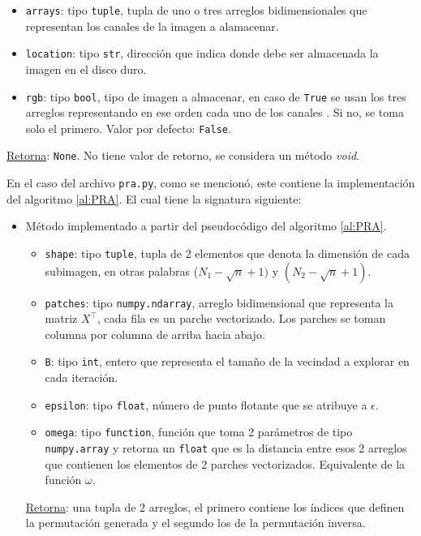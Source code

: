 \begin{itemize}
	\begin{itemize}
		\item \texttt{arrays}: tipo \texttt{tuple}, tupla de uno o tres arreglos bidimensionales que representan los canales de la imagen a alamacenar.
		\item \texttt{location}: tipo \texttt{str}, direcci\'on que indica donde debe ser almacenada la imagen en el disco duro.
		\item \texttt{rgb}: tipo \texttt{bool}, tipo de imagen a almacenar, en caso de \texttt{True} se usan los tres arreglos representando en ese orden cada uno de los canales \RGB. Si no, se toma solo el primero. Valor por defecto: \texttt{False}. 
	\end{itemize}
	\underline{Retorna}: \texttt{None}. No tiene valor de retorno, se considera un m\'etodo \textit{void}.
\end{itemize}

En el caso del archivo \texttt{pra.py}, como se mencion\'o, este contiene la implementaci\'on del algoritmo \ref{al:PRA}. El cual tiene la signatura siguiente:
\begin{itemize}
	\item M\'etodo implementado a partir del pseudoc\'odigo del algoritmo \ref{al:PRA}.
	
	\begin{itemize}
		\item \texttt{shape}: tipo \texttt{tuple}, tupla de 2 elementos que denota la dimensi\'on de cada subimagen, en otras palabras ($N_1 - \sqrt{n} + 1)$ y $(N_2 - \sqrt{n} + 1)$.
		\item \texttt{patches}: tipo \texttt{numpy.ndarray}, arreglo bidimensional que representa la matriz $X^\intercal$, cada fila es un parche vectorizado. Los parches se toman columna por columna de arriba hacia abajo.
		\item \texttt{B}: tipo \texttt{int}, entero que representa el tamaño de la vecindad a explorar en cada iteraci\'on.
		\item \texttt{epsilon}: tipo \texttt{float}, n\'umero de punto flotante que se atribuye a $\epsilon$.
		\item \texttt{omega}: tipo \texttt{function}, funci\'on que toma 2 par\'ametros de tipo \texttt{numpy.array} y retorna un \texttt{float} que es la distancia entre esos 2 arreglos que contienen los elementos de 2 parches vectorizados. Equivalente de la funci\'on $\omega$.
	\end{itemize}
	\underline{Retorna}: una tupla de 2 arreglos, el primero contiene los \'indices que definen la permutaci\'on generada y el segundo los de la permutaci\'on inversa.
\end{itemize}

